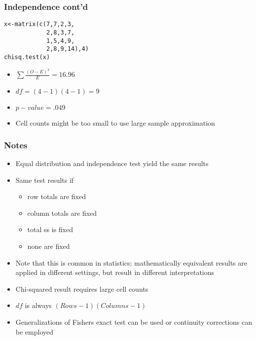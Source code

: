 \documentclass[aspectratio=169]{beamer}
\begin{document}
\begin{frame}[fragile]\frametitle{Independence cont'd}
\begin{verbatim}
x<-matrix(c(7,7,2,3,
            2,8,3,7,
            1,5,4,9,
            2,8,9,14),4)
chisq.test(x)
\end{verbatim} 
\begin{itemize}
\item $\sum \frac{(O - E)^2}{E} = 16.96$
\item $df = (4 - 1)(4 - 1) = 9$ 
\item $p-value = .049$
\item Cell counts might be too small to use
large sample approximation
\end{itemize}
\end{frame}

\begin{frame}\frametitle{Notes}
\begin{itemize}
\item Equal distribution and independence test yield the same results
\item Same test results if
  \begin{itemize}
  \item row totals are fixed 
  \item column totals are fixed
  \item total ss is fixed
  \item none are fixed
  \end{itemize}
\item Note that this is common in statistics; mathematically
  equivalent results are applied in different settings, but result in
  different interpretations
\end{itemize}
\end{frame}

\begin{frame}
\begin{itemize}
\item  Chi-squared result requires large cell counts
\item $df$ is always $(Rows - 1)(Columns - 1)$
\item Generalizations of Fishers exact test can be used or continuity
  corrections can be employed
\end{itemize}
\end{frame}
\end{document}
